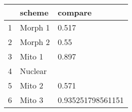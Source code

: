 \begin{table}[ht]
\centering
\begin{tabular}{rll}
  \hline
 & scheme & compare \\ 
  \hline
1 & Morph 1 & 0.517 \\ 
  2 & Morph 2 & 0.55 \\ 
  3 & Mito 1 & 0.897 \\ 
  4 & Nuclear &  \\ 
  5 & Mito 2 & 0.571 \\ 
  6 & Mito 3 & 0.935251798561151 \\ 
   \hline
\end{tabular}
\label{lldif}
\end{table}
